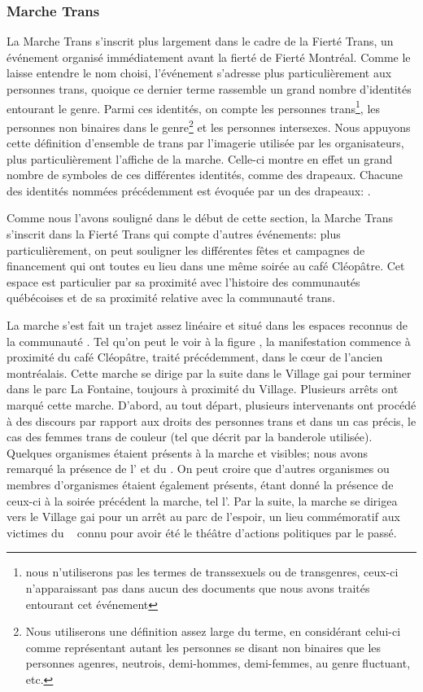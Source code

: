 \subsubsection{Marche Trans}
\label{subsubsec:marchetrans}
La Marche Trans s'inscrit plus largement dans le cadre de la Fierté Trans, un événement organisé immédiatement avant la fierté de Fierté Montréal. 
Comme le laisse entendre le nom choisi, l'événement s'adresse plus particulièrement aux personnes trans, quoique ce dernier terme rassemble un grand nombre d'identités entourant le genre. 
Parmi ces identités, on compte les personnes trans\footnote{nous n'utiliserons pas les termes de transsexuels ou de   transgenres, ceux-ci n'apparaissant pas dans aucun des documents que nous   avons traités entourant cet événement}, les personnes non binaires dans le genre\footnote{Nous utiliserons une définition assez large du terme, en   considérant celui-ci comme représentant autant les personnes se disant   non binaires que les personnes agenres, neutrois, demi-hommes, demi-femmes,   au genre fluctuant, etc.\citep[see][]{Barker2015}} et les personnes intersexes. 
Nous appuyons cette définition d'ensemble de trans par l'imagerie utilisée par les organisateurs, plus particulièrement l'affiche de la marche.
Celle-ci montre en effet un grand nombre de symboles de ces différentes identités, comme des drapeaux. 
Chacune des identités nommées précédemment est évoquée par un des drapeaux: .

Comme nous l'avons souligné dans le début de cette section, la Marche Trans s'inscrit dans la Fierté Trans qui compte d'autres événements: plus particulièrement, on peut souligner les différentes fêtes et campagnes de financement qui ont toutes eu lieu dans une même soirée au café Cléopâtre. 
Cet espace est particulier par sa proximité avec l'histoire des communautés \lgbt{} québécoises et de sa proximité relative avec la communauté trans.

La marche s'est fait un trajet assez linéaire et situé dans les espaces reconnus de la communauté \lgbt{}. 
Tel qu'on peut le voir à la figure , la manifestation commence à proximité du café Cléopâtre, traité précédemment, dans le cœur de l'ancien  montréalais. 
Cette marche se dirige par la suite dans le Village gai pour terminer dans le parc La Fontaine, toujours à proximité du Village. 
Plusieurs arrêts ont marqué cette marche. 
D'abord, au tout départ, plusieurs intervenants ont procédé à des discours par rapport aux droits des personnes trans et dans un cas précis, le cas des femmes trans de couleur (tel que décrit par la banderole utilisée).
Quelques organismes étaient présents à la marche et visibles; nous avons remarqué la présence de l'\atq{} et du \rlq{}. 
On peut croire que d'autres organismes ou membres d'organismes étaient également présents, étant donné la présence de ceux-ci à la soirée précédent la marche, tel l'\astteq{}. 
Par la suite, la marche se dirigea vers le Village gai pour un arrêt au parc de l'espoir, un lieu commémoratif aux victimes du \sida{}~\citep{Lafontaine2012} connu pour avoir été le théâtre d'actions politiques par le passé.

